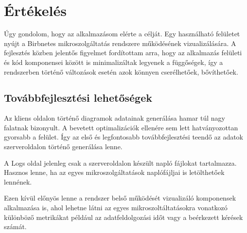 \chapter{Értékelés}
\label{chapt:summary}
Úgy gondolom, hogy az alkalmazásom elérte a célját.
Egy használható felületet nyújt a Birbnetes mikroszolgáltatás rendszere működésének vizualizálására.
A fejlesztés közben jelentős figyelmet fordítottam arra, hogy az alkalmazás felületi és kód komponensei között is
minimalizáltak legyenek a függőségek, így a rendszerben történő változások esetén azok könnyen cserélhetőek, bővíthetőek.
\section{Továbbfejlesztési lehetőségek}
Az kliens oldalon történő diagramok adatainak generálása hamar túl nagy falatnak bizonyult.
A bevetett optimalizációk ellenére sem lett hatványozottan gyorsabb a felület.
Így az első és legfontosabb továbbfejlesztési teendő az adatok szerveroldalon történő generálása lenne.

A Logs oldal jelenleg csak a szerveroldalon készült napló fájlokat tartalmazza.
Hasznos lenne, ha az egyes mikroszolgáltatások naplófájljai is letölthetőek lennének.

Ezen kívül előnyös lenne a rendszer belső működését vizualizáló komponensek alkalmazása is, 
ahol lehetne látni az egyes mikroszoltáltatásokra vonatkozó különböző metrikákat például az adatfeldolgozási időt vagy a beérkezett kérések számát. 